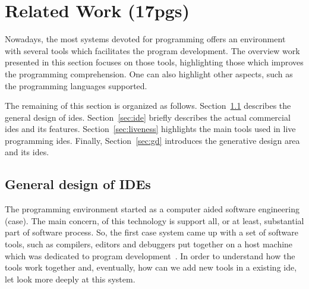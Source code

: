 
% 
% 

\section{Related Work (17pgs)}
\label{sec:rw}

Nowadays, the most systems devoted for programming offers an environment with several tools which facilitates the program development. The overview work presented in this section focuses on those tools, highlighting those which improves the programming comprehension. One can also highlight other aspects, such as the programming languages supported.

The remaining of this section is organized as follows. Section~\ref{sec:gdide} describes the general design of \ac{ide}s. Section~\ref{sec:ide} briefly describes the actual commercial \ac{ide}s and its features. Section~\ref{sec:liveness} highlights the main tools used in live programming \ac{ide}s. Finally, Section~\ref{sec:gd} introduces the generative design area and its \ac{ide}s.

\subsection{General design of IDEs}
\label{sec:gdide}

The programming environment started as a computer aided software engineering (\ac{case}). The main concern, of this technology is support all, or at least, substantial part of software process. So, the first \ac{case} system came up with a set of software tools, such as compilers, editors and debuggers put together on a host machine which was dedicated to program development~\cite{ivie1977programmer}. In order to understand how the tools work together and, eventually, how can we add new tools in a existing \ac{ide}, let look more deeply at this system. 

